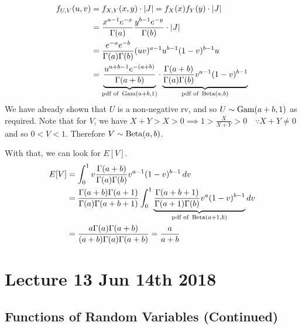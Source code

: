 \documentclass[notoc,notitlepage]{tufte-book}
\begin{document}
\begin{solution}
  \begin{align*}
    f_{U, V}(u, v) &= f_{X, Y}(x, y) \cdot \left|J\right| = f_X(x) f_Y(y) \cdot \left|J\right| \\
                   &= \frac{x^{a - 1} e^{-x}}{\Gamma(a)} \frac{y^{b - 1} e^{-y}}{\Gamma(b)} \cdot \left|J\right| \\
                   &= \frac{e^{-a} e^{-b}}{\Gamma(a) \Gamma(b)} (uv)^{a - 1} u^{b - 1} ( 1 - v )^{b - 1} u \\
                   &= \underbrace{ \frac{u^{a + b - 1} e^{-(a + b)}}{\Gamma(a + b)} }_{\text{pdf of } \operatorname{Gam}(a + b, 1)} \cdot \underbrace{ \frac{\Gamma(a + b)}{\Gamma(a) \Gamma(b)} v^{a - 1} (1 - v)^{b - 1} }_{\text{pdf of } \operatorname{Beta}(a, b)}
  \end{align*}
  We have already shown that $U$ is a non-negative rv, and so $U \sim \operatorname{Gam}(a + b, 1)$ as required. Note that for $V$, we have
  $X + Y > X > 0 \implies 1 > \frac{X}{X + Y} > 0 \quad \because X + Y \neq 0$ and so $0 < V < 1$. Therefore $V \sim \operatorname{Beta}(a, b)$.

  With that, we can look for $E[V]$.
  \begin{align*}
    E[V] &= \int_{0}^{1} v \frac{\Gamma(a + b)}{\Gamma(a) \Gamma(b)} v^{a - 1} (1 - v)^{b - 1} \mathop{}\!d{v} \\
         &= \frac{\Gamma(a + b) \Gamma(a + 1)}{\Gamma(a) \Gamma(a + b + 1)} \int_{0}^{1} \underbrace{ \frac{\Gamma(a + b + 1)}{\Gamma(a + 1) \Gamma(b)} v^a (1 - v)^{b - 1} }_{\text{pdf of } \operatorname{Beta}(a + 1, b)} \mathop{}\!d{v} \\
         &= \frac{a \Gamma(a) \Gamma(a + b)}{(a + b) \Gamma(a) \Gamma(a + b)} = \frac{a}{a + b}
  \end{align*}
\end{solution}




\chapter{Lecture 13 Jun 14th 2018}%
\label{chp:lecture_13_jun_14th_2018}

\section{Functions of Random Variables (Continued)}%
\label{sec:functions_of_random_variables_continued}
\end{document}
